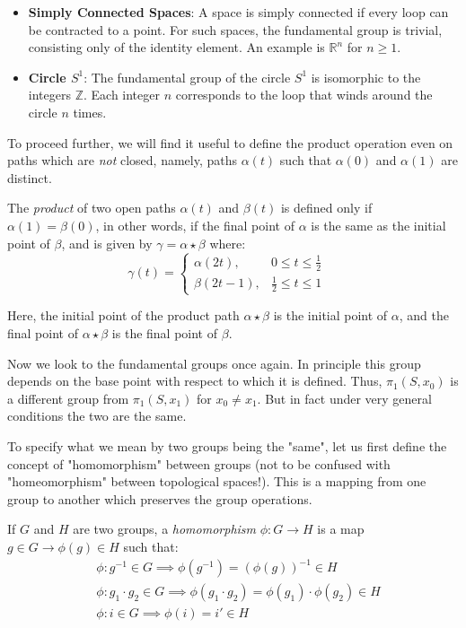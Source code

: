 \documentclass{article}
\begin{document}
\begin{itemize}
    \item \textbf{Simply Connected Spaces}: A space is simply connected if every loop can be contracted to a point. For such spaces, the fundamental group is trivial, consisting only of the identity element. An example is \(\mathbb{R}^n\) for \(n \geq 1\).

    \item \textbf{Circle \(S^1\)}: The fundamental group of the circle \(S^1\) is isomorphic to the integers \(\mathbb{Z}\). Each integer \(n\) corresponds to the loop that winds around the circle \(n\) times.
\end{itemize}

To proceed further, we will find it useful to define the product operation even on paths which are \textit{not} closed, namely, paths \(\alpha(t)\) such that \(\alpha(0)\) and \(\alpha(1)\) are distinct. 

\begin{theorem}
The \textit{product} of two open paths \(\alpha(t)\) and \(\beta(t)\) is defined only if \(\alpha(1) = \beta(0)\), in other words, if the final point of \(\alpha\) is the same as the initial point of \(\beta\), and is given by \(\gamma = \alpha \star \beta\) where:
\[
\gamma(t) = 
\begin{cases} 
\alpha(2t), & 0 \leq t \leq \frac{1}{2} \\
\beta(2t - 1), & \frac{1}{2} \leq t \leq 1
\end{cases} \quad 
\]

\end{theorem}

Here, the initial point of the product path \(\alpha \star \beta\) is the initial point of \(\alpha\), and the final point of \(\alpha \star \beta\) is the final point of \(\beta\).

Now we look to the fundamental groups once again. In principle this group depends on the base point with respect to which it is defined. Thus, \(\pi_1(S, x_0)\) is a different group from \(\pi_1(S, x_1)\) for \(x_0 \neq x_1\). But in fact under very general conditions the two are the same. 

To specify what we mean by two groups being the "same", let us first define the concept of "homomorphism" between groups (not to be confused with "homeomorphism" between topological spaces!). This is a mapping from one group to another which preserves the group operations. 

\begin{theorem}
    
If \(G\) and \(H\) are two groups, a \textit{homomorphism} \(\phi: G \to H\) is a map \(g \in G \rightarrow \phi(g) \in H\) such that:
\[
\begin{aligned}
&\phi: g^{-1} \in G \implies \phi(g^{-1}) = (\phi(g))^{-1} \in H \\
&\phi: g_1 \cdot g_2 \in G \implies \phi(g_1 \cdot g_2) = \phi(g_1) \cdot \phi(g_2) \in H \\
&\phi: i \in G \implies \phi(i) = i' \in H
\end{aligned}
\]
    
\end{theorem}
\end{document}
